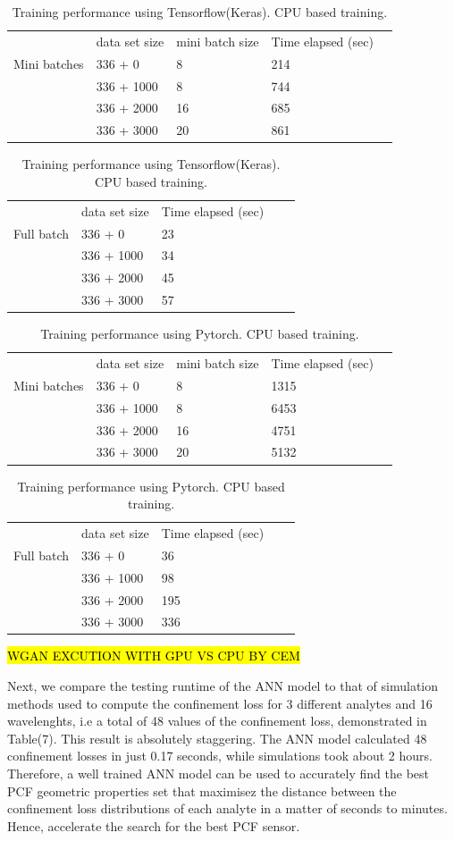\documentclass[draft, 10pt]{IEEEtran}
\begin{document}
\begin{table}[h]
\begin{tabular}{lllll}
    & data set size & mini batch size & Time elapsed (sec) \\
Mini batches    &336 + 0 & 8 & 214 & \\
    &336 + 1000 & 8 & 744 & \\
    &336 + 2000 & 16 & 685  & \\ 
    &336 + 3000 & 20 & 861  & \\
\end{tabular}
\begin{tabular}{lllll}
   & data set size & Time elapsed (sec) \\
Full batch    &336 + 0 &  23 & \\
    &336 + 1000 &  34 & \\
    &336 + 2000 &  45 & \\ 
    &336 + 3000 &  57 & \\
\end{tabular}
\caption{Training performance using Tensorflow(Keras). CPU based training.}
\end{table}
\begin{table}[h]
\begin{tabular}{lllll}
 & data set size & mini batch size & Time elapsed (sec) \\
Mini batches    & 336 + 0 & 8 & 1315 & \\
    & 336 + 1000 & 8 & 6453  & \\
    & 336 + 2000 & 16 & 4751  & \\ 
    & 336 + 3000 & 20 & 5132 & \\
\end{tabular}
\begin{tabular}{lllll}
   &data set size & Time elapsed (sec) \\
   Full batch &336 + 0 &  36  & \\
    & 336 + 1000 &  98  & \\
    & 336 + 2000 &  195  & \\ 
    & 336 + 3000 &  336  & \\
\end{tabular}
\caption{Training performance using Pytorch. CPU based training.}
\end{table}

\hl{WGAN EXCUTION WITH GPU VS CPU BY CEM}

Next, we compare the testing runtime of the ANN model to that of simulation methods used to compute the confinement loss for 3 different analytes and 16 wavelenghts, i.e a total of 48 values of the confinement loss, demonstrated in Table(7). This result is absolutely staggering. The ANN model calculated 48 confinement losses in just 0.17 seconds, while simulations took about 2 hours. Therefore, a well trained ANN model can be used to accurately find the best PCF geometric properties set that maximisez the distance between the confinement loss distributions of each analyte in a matter of seconds to minutes. Hence, accelerate the search for the best PCF sensor.
\end{document}
